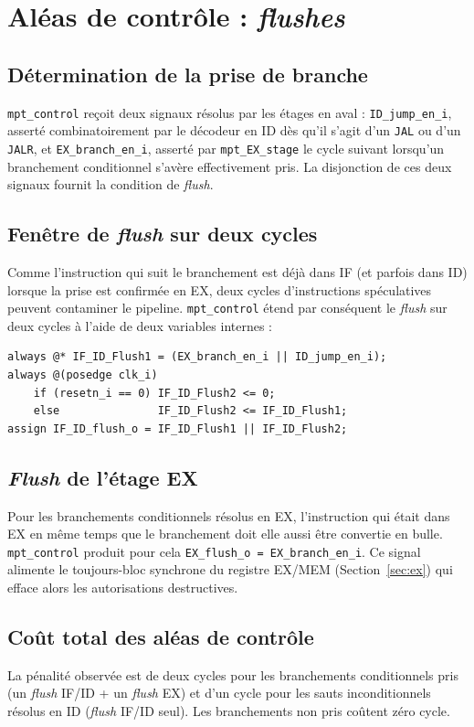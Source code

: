 \documentclass[11pt,a4paper,oneside]{report}
\begin{document}
\section{Aléas de contrôle : \textit{flushes}}
\label{sec:flush}

\subsection{Détermination de la prise de branche}
\texttt{mpt\_control} reçoit deux signaux résolus par les étages
en aval : \texttt{ID\_jump\_en\_i}, asserté combinatoirement par
le décodeur en ID dès qu'il s'agit d'un \texttt{JAL} ou d'un
\texttt{JALR}, et \texttt{EX\_branch\_en\_i}, asserté par
\texttt{mpt\_EX\_stage} le cycle suivant lorsqu'un branchement
conditionnel s'avère effectivement pris. La disjonction de ces
deux signaux fournit la condition de \textit{flush}.

\subsection{Fenêtre de \textit{flush} sur deux cycles}
Comme l'instruction qui suit le branchement est déjà dans IF (et
parfois dans ID) lorsque la prise est confirmée en EX, deux
cycles d'instructions spéculatives peuvent contaminer le pipeline.
\texttt{mpt\_control} étend par conséquent le \textit{flush} sur
deux cycles à l'aide de deux variables internes :
\begin{lstlisting}[caption={Étalement du flush IF/ID sur deux cycles d'horloge.}]
always @* IF_ID_Flush1 = (EX_branch_en_i || ID_jump_en_i);
always @(posedge clk_i)
    if (resetn_i == 0) IF_ID_Flush2 <= 0;
    else               IF_ID_Flush2 <= IF_ID_Flush1;
assign IF_ID_flush_o = IF_ID_Flush1 || IF_ID_Flush2;
\end{lstlisting}

\subsection{\textit{Flush} de l'étage EX}
Pour les branchements conditionnels résolus en EX, l'instruction
qui était dans EX en même temps que le branchement doit elle aussi
être convertie en bulle.
\texttt{mpt\_control} produit pour cela
\texttt{EX\_flush\_o = EX\_branch\_en\_i}. Ce signal alimente le
toujours-bloc synchrone du registre EX/MEM
(Section~\ref{sec:ex}) qui efface alors les autorisations destructives.

\subsection{Coût total des aléas de contrôle}
La pénalité observée est de deux cycles pour les branchements
conditionnels pris (un \textit{flush} IF/ID + un \textit{flush}
EX) et d'un cycle pour les sauts inconditionnels résolus en ID
(\textit{flush} IF/ID seul). Les branchements non pris coûtent
zéro cycle.
\end{document}

